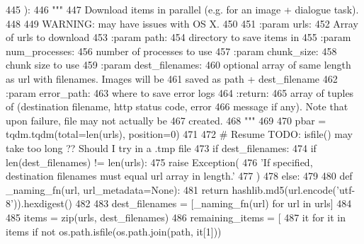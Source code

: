 \begin{DoxyCode}
445 ):
446     \textcolor{stringliteral}{"""}
447 \textcolor{stringliteral}{    Download items in parallel (e.g. for an image + dialogue task).}
448 \textcolor{stringliteral}{}
449 \textcolor{stringliteral}{    WARNING: may have issues with OS X.}
450 \textcolor{stringliteral}{}
451 \textcolor{stringliteral}{    :param urls:}
452 \textcolor{stringliteral}{        Array of urls to download}
453 \textcolor{stringliteral}{    :param path:}
454 \textcolor{stringliteral}{        directory to save items in}
455 \textcolor{stringliteral}{    :param num\_processes:}
456 \textcolor{stringliteral}{        number of processes to use}
457 \textcolor{stringliteral}{    :param chunk\_size:}
458 \textcolor{stringliteral}{        chunk size to use}
459 \textcolor{stringliteral}{    :param dest\_filenames:}
460 \textcolor{stringliteral}{        optional array of same length as url with filenames.  Images will be}
461 \textcolor{stringliteral}{        saved as path + dest\_filename}
462 \textcolor{stringliteral}{    :param error\_path:}
463 \textcolor{stringliteral}{        where to save error logs}
464 \textcolor{stringliteral}{    :return:}
465 \textcolor{stringliteral}{        array of tuples of (destination filename, http status code, error}
466 \textcolor{stringliteral}{        message if any). Note that upon failure, file may not actually be}
467 \textcolor{stringliteral}{        created.}
468 \textcolor{stringliteral}{    """}
469 
470     pbar = tqdm.tqdm(total=len(urls), position=0)
471 
472     \textcolor{comment}{# Resume TODO: isfile() may take too long ?? Should I try in a .tmp file}
473     \textcolor{keywordflow}{if} dest\_filenames:
474         \textcolor{keywordflow}{if} len(dest\_filenames) != len(urls):
475             \textcolor{keywordflow}{raise} Exception(
476                 \textcolor{stringliteral}{'If specified, destination filenames must equal url array in length.'}
477             )
478     \textcolor{keywordflow}{else}:
479 
480         \textcolor{keyword}{def }\_naming\_fn(url, url\_metadata=None):
481             \textcolor{keywordflow}{return} hashlib.md5(url.encode(\textcolor{stringliteral}{'utf-8'})).hexdigest()
482 
483         dest\_filenames = [\_naming\_fn(url) \textcolor{keywordflow}{for} url \textcolor{keywordflow}{in} urls]
484 
485     items = zip(urls, dest\_filenames)
486     remaining\_items = [
487         it \textcolor{keywordflow}{for} it \textcolor{keywordflow}{in} items \textcolor{keywordflow}{if} \textcolor{keywordflow}{not} os.path.isfile(os.path.join(path, it[1]))

\end{DoxyCode}
